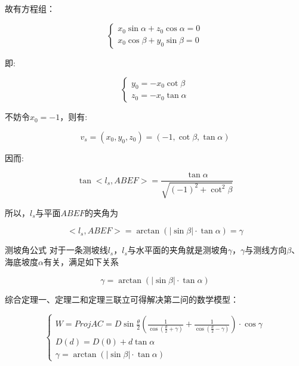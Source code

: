 故有方程组：

\begin{equation}
    \begin{cases}
        x_0\sin\alpha + z_0\cos\alpha = 0 \\
        x_0\cos\beta + y_0 \sin\beta = 0
    \end{cases}
\end{equation}

即:

\begin{equation*}
    \begin{cases}
        y_0 = -x_0 \cot \beta \\
        z_0 = -x_0 \tan \alpha
    \end{cases}
\end{equation*}

不妨令$x_0 = -1$，则有:

\begin{equation}
    v_s
    = (x_0, y_0, z_0)
    = \left(
    -1,
    \cot \beta,
    \tan \alpha
    \right)
\end{equation}

因而:

\begin{equation*}
    \tan <l_s, ABEF>
    = \frac {\tan \alpha} {\sqrt{(-1)^2 + \cot ^2 \beta}}
\end{equation*}

所以，$l_s$与平面$ABEF$的夹角为

\begin{equation}
    <l_s, ABEF>
    = \arctan \left(|\sin \beta| \cdot  \tan \alpha\right)
    = \gamma
\end{equation}

\begin{mcmTheorem}{测坡角公式}
    \label{theorem:测坡角公式}
    对于一条测坡线$l_s$，$l_s$与水平面的夹角就是测坡角$\gamma$，$\gamma$与测线方向$\beta$、海底坡度$\alpha$有关，满足如下关系

    \begin{equation}
        \gamma = \arctan(|\sin\beta| \cdot \tan\alpha)
    \end{equation}
\end{mcmTheorem}


综合定理一、定理二和定理三联立可得解决第二问的数学模型：

\begin{equation}
    \begin{cases}
        W =
        Proj AC =
        D\sin\frac{\theta}{2}\left(\frac{1}{\cos(\frac{\theta}{2}+\gamma)} + \frac{1}{\cos(\frac{\theta}{2}-\gamma)}\right) \cdot \cos \gamma   \\
        D(d) = D(0) + d\tan\alpha \\
        \gamma = \arctan(|\sin\beta| \cdot \tan\alpha)
    \end{cases}
\end{equation}

